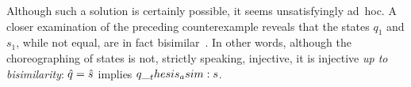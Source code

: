 
Although such a solution is certainly possible, it seems unsatisfyingly ad~hoc.
A closer examination of the preceding counterexample reveals that the states $q_1$ and $s_1$, while not equal, are in fact bisimilar~.
In other words, although the choreographing of states is not, strictly speaking, injective, it is injective \emph{up to bisimilarity}: $\hat{q} = \hat{s}$ implies $q \__thesis_asim: s$.



